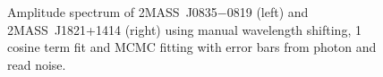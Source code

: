 \documentclass[twocolumn]{aastex6}
\newcommand{\sha}{2MASS~J0835$-$0819}
\newcommand{\shb}{2MASS~J1821+1414}
\begin{document}
\begin{figure}[!t]
\centering
{}
	\caption{Amplitude spectrum of {\sha} (left)  and {\shb} (right) using manual wavelength shifting, 1 cosine term fit and MCMC fitting with error bars from photon and read noise.}
	\label{fig:ampSpecManualS}
	\vspace{0.1in}
\end{figure} 
\end{document}
